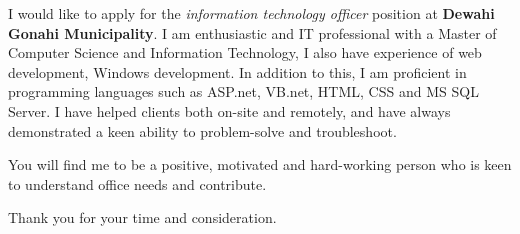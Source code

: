 I would like to apply for the \textit{information technology officer} position at \textbf{Dewahi Gonahi Municipality}. I am enthusiastic and IT professional with a Master of Computer Science and Information Technology, I also have experience of web development, Windows
development. In addition to this, I am proficient in programming languages such as ASP.net, VB.net, HTML, CSS and MS SQL Server.
I have helped clients both on-site and remotely, and have always demonstrated a keen ability to problem-solve and troubleshoot.

You will find me to be a positive, motivated and hard-working person who is keen to understand office needs and contribute.


Thank you for your time and consideration.
